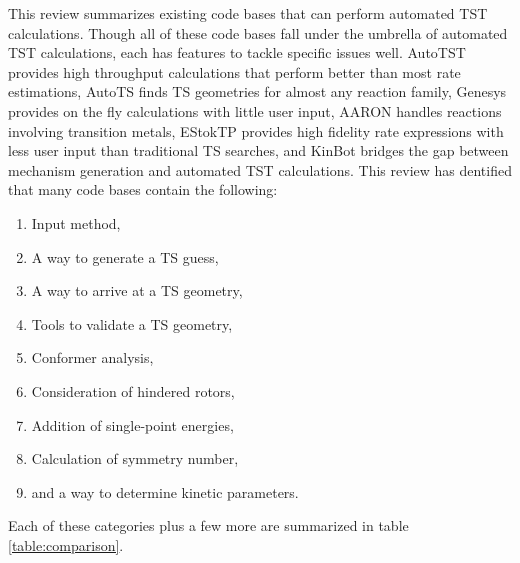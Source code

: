 \documentclass[preprint, 11pt]{elsarticle} %
\begin{document}
This review summarizes existing code bases that can perform automated TST calculations.
Though all of these code bases fall under the umbrella of automated TST calculations, each has features to tackle specific issues well.
AutoTST provides high throughput calculations that perform better than most rate estimations, AutoTS finds TS geometries for almost any reaction family, Genesys provides on the fly calculations with little user input, AARON handles reactions involving transition metals, EStokTP provides high fidelity rate expressions with less user input than traditional TS searches, and KinBot bridges the gap between mechanism generation and automated TST calculations. 
This review has dentified that many code bases contain the following:
\begin{enumerate}
    \item Input method,
    \item A way to generate a TS guess,
    \item A way to arrive at a TS geometry,
    \item Tools to validate a TS geometry,
    \item Conformer analysis,
    \item Consideration of hindered rotors,
    \item Addition of single-point energies,
    \item Calculation of symmetry number,
    \item and a way to determine kinetic parameters.
\end{enumerate}

Each of these categories plus a few more are summarized in table \ref{table:comparison}. 
\end{document}
